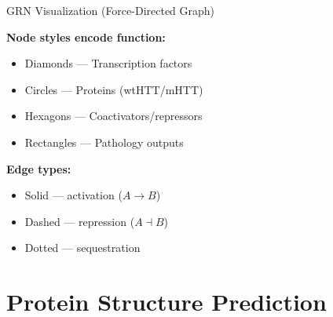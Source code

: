 \documentclass[aspectratio=169,11pt]{beamer}
\begin{document}
\begin{frame}{GRN Visualization (Force-Directed Graph)}
    \begin{center}
    \end{center}

    \textbf{Node styles encode function:}
    \begin{itemize}
        \item {\color{htblue}Diamonds} --- Transcription factors
        \item {\color{htgreen}Circles} --- Proteins (wtHTT/mHTT)
        \item {\color{htorange}Hexagons} --- Coactivators/repressors
        \item {\color{htred}Rectangles} --- Pathology outputs
    \end{itemize}

    \textbf{Edge types:}
    \begin{itemize}
        \item {\color{htgreen}Solid} --- activation ($A \to B$)
        \item {\color{htred}Dashed} --- repression ($A \dashv B$)
        \item {\color{htpurple}Dotted} --- sequestration
    \end{itemize}
\end{frame}

\section{Protein Structure Prediction}
\end{document}
